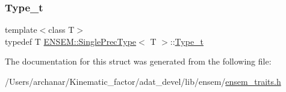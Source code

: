 \subsubsection{\texorpdfstring{Type\_t}{Type\_t}\hspace{0.1cm}{\footnotesize\ttfamily [2/2]}}
{\footnotesize\ttfamily template$<$class T$>$ \\
typedef T \mbox{\hyperlink{structENSEM_1_1SinglePrecType}{E\+N\+S\+E\+M\+::\+Single\+Prec\+Type}}$<$ T $>$\+::\mbox{\hyperlink{structENSEM_1_1SinglePrecType_ab7ef789d62d59167eff4df3cc221c4e1}{Type\+\_\+t}}}



The documentation for this struct was generated from the following file\+:\begin{DoxyCompactItemize}
\item 
/\+Users/archanar/\+Kinematic\+\_\+factor/adat\+\_\+devel/lib/ensem/\mbox{\hyperlink{lib_2ensem_2ensem__traits_8h}{ensem\+\_\+traits.\+h}}\end{DoxyCompactItemize}
